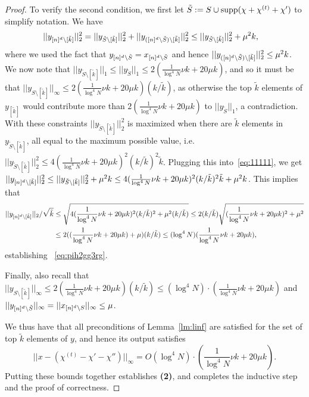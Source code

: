 \begin{proof}
To verify the second condition, we first let $\tilde S:=S\cup \operatorname{supp}(\chi+\chi^{(t)}+\chi')$ to simplify notation. We have
\begin{equation}\label{eq:11111}
\begin{split}
||y_{{[n]^d}\setminus [\tilde k]}||_2^2&=||y_{\tilde S\setminus [\tilde k]}||_2^2+||y_{({[n]^d}\setminus \tilde S)\setminus [\tilde k]}||_2^2\leq ||y_{\tilde S\setminus [\tilde k]}||_2^2+\mu^2 k,
\end{split}
\end{equation}
where we used the fact that $y_{{[n]^d}\setminus \tilde S}=x_{{[n]^d}\setminus \tilde S}$ and hence $||y_{({[n]^d}\setminus \tilde S)\setminus [\tilde k]}||_2^2\leq \mu^2 k$.
We now note that $||y_{\tilde S\setminus [\tilde k]}||_1\leq ||y_{\tilde S}||_1\leq 2(\frac1{\log^4 N}\nu k+20\mu k)$, and so it must be that $||y_{S\setminus [\tilde k]}||_\infty\leq 2(\frac1{\log^4 N}\nu k+20\mu k) (k/\tilde k)$, as otherwise the top $\tilde k$ elements of $y_{[\tilde k]}$ would contribute more than $2(\frac1{\log^4 N}\nu k+20\mu k)$ to $||y_{\tilde S}||_1$, a contradiction.  With these constraints $||y_{\tilde S\setminus [\tilde k]}||_2^2$ is maximized when there are $\tilde k$ elements in $y_{\tilde S\setminus [\tilde k]}$, all equal to the maximum possible value, i.e. $||y_{\tilde S\setminus [\tilde k]}||_2^2\leq 4(\frac1{\log^4 N}\nu k+20\mu k)^2 (k/\tilde k)^2 \tilde k$. Plugging this into~\eqref{eq:11111}, we get $||y_{{[n]^d}\setminus [\tilde k]}||_2^2\leq ||y_{\tilde S\setminus [\tilde k]}||_2^2+\mu^2k\leq 4(\frac1{\log^4 N}\nu k+20\mu k)^2 (k/\tilde k)^2 \tilde k+\mu^2 k$. This implies that 
\begin{equation*}
\begin{split}
||y_{{[n]^d}\setminus [\tilde k]}||_2/\sqrt{\tilde k}&\leq \sqrt{4(\frac1{\log^4 N}\nu k+20\mu k)^2 (k/\tilde k)^2+\mu^2 (k/\tilde k)}\leq 2 (k/\tilde k)\sqrt{(\frac1{\log^4 N}\nu k+20\mu k)^2  +\mu^2}\\
&\leq 2((\frac1{\log^4 N}\nu k+20\mu k)+\mu) (k/\tilde k)\leq (\log^4 N) (\frac1{\log^4 N}\nu k+20\mu k),
\end{split}
\end{equation*}
establishing ~\eqref{eq:pih2gg3rg}. 

Finally,  also recall that $||y_{S\setminus [\tilde k]}||_\infty\leq 2(\frac1{\log^4 N}\nu k+20\mu k) (k/\tilde k)\leq (\log^4 N)\cdot (\frac1{\log^4 N}\nu k+20\mu k)$ and $||y_{{[n]^d}\setminus \tilde S}||_\infty =||x_{{[n]^d}\setminus S}||_\infty\leq \mu$. 

We thus have that all preconditions of Lemma~\ref{lm:linf} are satisfied for the set of top $\tilde k$ elements of $y$, and hence its output satisfies 
$$
||x-(\chi^{(t)}-\chi'-\chi'')||_\infty=O(\log^4 N)\cdot(\frac1{\log^4 N}\nu k+20\mu k).
$$
Putting these bounds together establishes {\bf (2)}, and completes the inductive step and the proof of correctness.


\end{proof}
